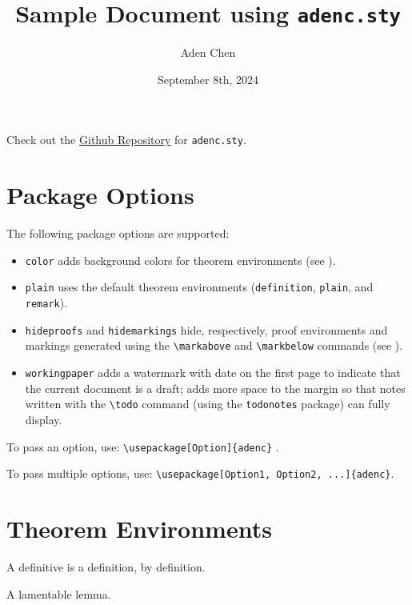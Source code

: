 \documentclass[10pt,letterpaper]{amsart}
\title{Sample Document using \texttt{adenc.sty}}
\author{Aden Chen}
\date{September 8th, 2024}
\begin{document}
\maketitle

\tableofcontents

\begin{mdframed}
Check out the \href{https://github.com/AdenChen27/latex}{Github Repository} for \texttt{adenc.sty}. 
\end{mdframed}


\section{Package Options}
The following package options are supported:
\begin{itemize}
  \item \verb|color| adds background colors for theorem environments (see ). 
  \item \verb|plain| uses the default theorem environments (\texttt{definition}, \texttt{plain}, and \texttt{remark}).
  \item \verb|hideproofs| and \verb|hidemarkings| hide, respectively, proof environments and markings generated using the \verb|\markabove| and \verb|\markbelow| commands (see ). 
  \item \verb|workingpaper| adds a watermark with date on the first page to indicate that the current document is a draft; adds more space to the margin so that notes written with the \verb|\todo| command (using the \verb|todonotes| package) can fully display. 
\end{itemize}

To pass an option, use: \verb|\usepackage[Option]{adenc}| . 

To pass multiple options, use: \verb|\usepackage[Option1, Option2, ...]{adenc}|. 


\section{Theorem Environments}
\label{sec:thm-env}

\begin{definition}
  A definitive  is a definition, by definition. 
\end{definition}

\begin{lemma}
  A lamentable lemma. 
\end{lemma}
\end{document}
